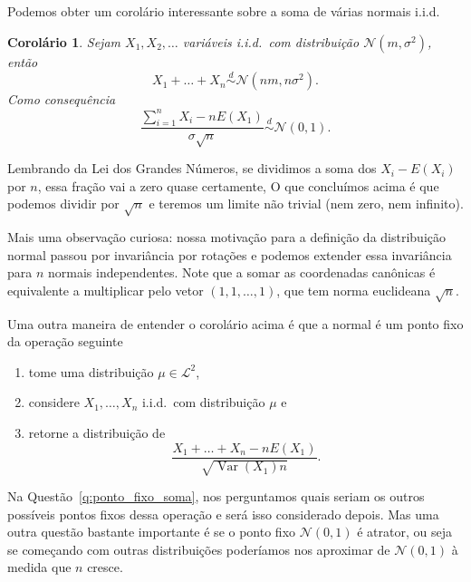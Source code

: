 \documentclass[reqno, draft]{book}
\newcommand*\1{\mathds{1}}
\newtheorem{corollary}[theorem]{Corolário}
\DeclareMathOperator{\Var}{Var}
\def \iid{i.i.d.~}
\def \distr{\overset{d}{\sim}}
\begin{document}

Podemos obter um corolário interessante sobre a soma de várias normais i.i.d.
\begin{corollary}
  \label{c:normaliz_normais}
  Sejam $X_1, X_2, \dots$ variáveis \iid com distribuição $\mathcal{N}(m,\sigma^2)$, então
  \begin{equation}
    X_1 + \dots + X_n \distr \mathcal{N}(nm, n \sigma^2).
  \end{equation}
  Como consequência
  \begin{equation}
    \frac{\sum_{i=1}^n X_i - n E(X_1)}{\sigma \sqrt{n}} \distr \mathcal{N}(0,1).
  \end{equation}
\end{corollary}

Lembrando da Lei dos Grandes Números, se dividimos a soma dos $X_i - E(X_i)$ por $n$, essa fração vai a zero quase certamente,
O que concluímos acima é que podemos dividir por $\sqrt{n}$ e teremos um limite não trivial (nem zero, nem infinito).

Mais uma observação curiosa: nossa motivação para a definição da distribuição normal passou por invariância por rotações e podemos extender essa invariância para $n$ normais independentes.
Note que a somar as coordenadas canônicas é equivalente a multiplicar pelo vetor $(1,1,\dots,1)$, que tem norma euclideana $\sqrt{n}$.

Uma outra maneira de entender o corolário acima é que a normal é um ponto fixo da operação seguinte
\begin{enumerate}[\quad a)]
\item tome uma distribuição $\mu \in \mathcal{L}^2$,
\item considere $X_1, \dots, X_n$ \iid com distribuição $\mu$ e
\item retorne a distribuição de
  \begin{equation}
    \frac{X_1 + \dots + X_n - n E(X_1)}{\sqrt{\Var(X_1) n}}.
  \end{equation}
\end{enumerate}

Na Questão~\ref{q:ponto_fixo_soma}, nos perguntamos quais seriam os outros possíveis pontos fixos dessa operação e será isso considerado depois.
Mas uma outra questão bastante importante é se o ponto fixo $\mathcal{N}(0,1)$ é atrator, ou seja se começando com outras distribuições poderíamos nos aproximar de $\mathcal{N}(0,1)$ à medida que $n$ cresce.
\end{document}
